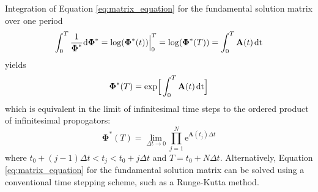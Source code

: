 \documentclass{article}
\begin{document}
Integration of Equation \ref{eq:matrix_equation} for the fundamental solution matrix 
over one 
period 
\begin{equation}
 \int_0^T\frac{1}{\boldsymbol{\Phi}^*}\mathrm{d\boldsymbol{\Phi}^*}
 =\log(\boldsymbol{\Phi}^*(t))\Big|_0^T=\log(\boldsymbol{\Phi}^*(T))
 =\int_0^T\mathbf{A}(t)\hspace{0.5mm}\mathrm{dt}
\end{equation}
yields
\begin{equation}
 \boldsymbol{\Phi}^*(T)=\text{exp}\Big[\int_0^T\mathbf{A}(t)\hspace{0.5mm}\mathrm{dt}\Big]
\end{equation}
which is equivalent in the limit of infinitesimal time steps to the ordered product
of infinitesimal propogators:
\begin{equation}
 \boldsymbol{\Phi}^*(T)=\lim_{\Delta{t}\rightarrow0}\prod_{j=1}^N\mathrm{e}^{\mathbf{A}(t_j)\Delta{t}}
 \label{eq:ordered_product}
\end{equation}
where $t_0+(j-1)\Delta{t}<t_j<t_0+j\Delta{t}$ and $T=t_0+N\Delta{t}$. Alternatively,
Equation \ref{eq:matrix_equation} for the fundamental solution matrix can be solved 
using a conventional time stepping scheme, such as a Runge-Kutta method.

\end{document}
